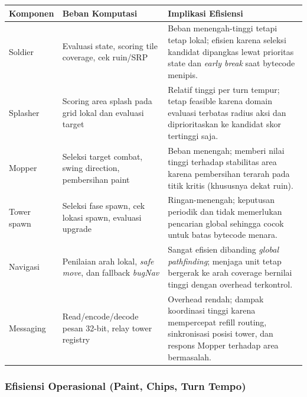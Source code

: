 \begin{longtable}{>{\raggedright\arraybackslash}p{} >{\raggedright\arraybackslash}p{} >{\raggedright\arraybackslash}p{}}
    \toprule
    \textbf{Komponen} & \textbf{Beban Komputasi}                                               & \textbf{Implikasi Efisiensi}                                                                                                                              \\
    \midrule
    \endhead
    Soldier           & Evaluasi state, scoring tile coverage, cek ruin/SRP                    & Beban menengah-tinggi tetapi tetap lokal; efisien karena seleksi kandidat dipangkas lewat prioritas state dan \textit{early break} saat bytecode menipis. \\
    Splasher          & Scoring area splash pada grid lokal dan evaluasi target                & Relatif tinggi per turn tempur; tetap feasible karena domain evaluasi terbatas radius aksi dan diprioritaskan ke kandidat skor tertinggi saja.            \\
    Mopper            & Seleksi target combat, swing direction, pembersihan paint              & Beban menengah; memberi nilai tinggi terhadap stabilitas area karena pembersihan terarah pada titik kritis (khususnya dekat ruin).                        \\
    Tower spawn       & Seleksi fase spawn, cek lokasi spawn, evaluasi upgrade                 & Ringan-menengah; keputusan periodik dan tidak memerlukan pencarian global sehingga cocok untuk batas bytecode menara.                                     \\
    Navigasi          & Penilaian arah lokal, \textit{safe move}, dan fallback \textit{bugNav} & Sangat efisien dibanding \textit{global pathfinding}; menjaga unit tetap bergerak ke arah coverage bernilai tinggi dengan overhead terkontrol.            \\
    Messaging         & Read/encode/decode pesan 32-bit, relay tower registry                  & Overhead rendah; dampak koordinasi tinggi karena mempercepat refill routing, sinkronisasi posisi tower, dan respons Mopper terhadap area bermasalah.      \\
    \bottomrule
\end{longtable}

\subsubsection{Efisiensi Operasional (Paint, Chips, Turn Tempo)}

